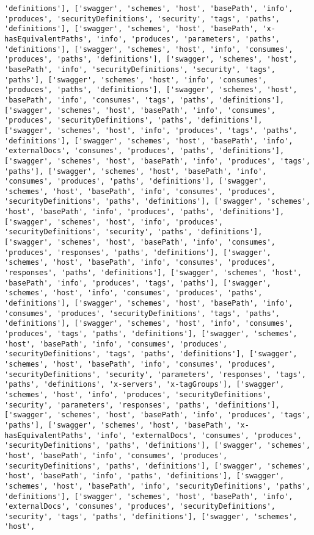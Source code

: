 \documentclass[11pt]{article}
\begin{document}
\begin{Verbatim}[commandchars=\\\{\}]
'definitions'], ['swagger', 'schemes', 'host', 'basePath', 'info', 'produces', 'securityDefinitions', 'security', 'tags', 'paths', 'definitions'], ['swagger', 'schemes', 'host', 'basePath', 'x-hasEquivalentPaths', 'info', 'produces', 'parameters', 'paths', 'definitions'], ['swagger', 'schemes', 'host', 'info', 'consumes', 'produces', 'paths', 'definitions'], ['swagger', 'schemes', 'host', 'basePath', 'info', 'securityDefinitions', 'security', 'tags', 'paths'], ['swagger', 'schemes', 'host', 'info', 'consumes', 'produces', 'paths', 'definitions'], ['swagger', 'schemes', 'host', 'basePath', 'info', 'consumes', 'tags', 'paths', 'definitions'], ['swagger', 'schemes', 'host', 'basePath', 'info', 'consumes', 'produces', 'securityDefinitions', 'paths', 'definitions'], ['swagger', 'schemes', 'host', 'info', 'produces', 'tags', 'paths', 'definitions'], ['swagger', 'schemes', 'host', 'basePath', 'info', 'externalDocs', 'consumes', 'produces', 'paths', 'definitions'], ['swagger', 'schemes', 'host', 'basePath', 'info', 'produces', 'tags', 'paths'], ['swagger', 'schemes', 'host', 'basePath', 'info', 'consumes', 'produces', 'paths', 'definitions'], ['swagger', 'schemes', 'host', 'basePath', 'info', 'consumes', 'produces', 'securityDefinitions', 'paths', 'definitions'], ['swagger', 'schemes', 'host', 'basePath', 'info', 'produces', 'paths', 'definitions'], ['swagger', 'schemes', 'host', 'info', 'produces', 'securityDefinitions', 'security', 'paths', 'definitions'], ['swagger', 'schemes', 'host', 'basePath', 'info', 'consumes', 'produces', 'responses', 'paths', 'definitions'], ['swagger', 'schemes', 'host', 'basePath', 'info', 'consumes', 'produces', 'responses', 'paths', 'definitions'], ['swagger', 'schemes', 'host', 'basePath', 'info', 'produces', 'tags', 'paths'], ['swagger', 'schemes', 'host', 'info', 'consumes', 'produces', 'paths', 'definitions'], ['swagger', 'schemes', 'host', 'basePath', 'info', 'consumes', 'produces', 'securityDefinitions', 'tags', 'paths', 'definitions'], ['swagger', 'schemes', 'host', 'info', 'consumes', 'produces', 'tags', 'paths', 'definitions'], ['swagger', 'schemes', 'host', 'basePath', 'info', 'consumes', 'produces', 'securityDefinitions', 'tags', 'paths', 'definitions'], ['swagger', 'schemes', 'host', 'basePath', 'info', 'consumes', 'produces', 'securityDefinitions', 'security', 'parameters', 'responses', 'tags', 'paths', 'definitions', 'x-servers', 'x-tagGroups'], ['swagger', 'schemes', 'host', 'info', 'produces', 'securityDefinitions', 'security', 'parameters', 'responses', 'paths', 'definitions'], ['swagger', 'schemes', 'host', 'basePath', 'info', 'produces', 'tags', 'paths'], ['swagger', 'schemes', 'host', 'basePath', 'x-hasEquivalentPaths', 'info', 'externalDocs', 'consumes', 'produces', 'securityDefinitions', 'paths', 'definitions'], ['swagger', 'schemes', 'host', 'basePath', 'info', 'consumes', 'produces', 'securityDefinitions', 'paths', 'definitions'], ['swagger', 'schemes', 'host', 'basePath', 'info', 'paths', 'definitions'], ['swagger', 'schemes', 'host', 'basePath', 'info', 'securityDefinitions', 'paths', 'definitions'], ['swagger', 'schemes', 'host', 'basePath', 'info', 'externalDocs', 'consumes', 'produces', 'securityDefinitions', 'security', 'tags', 'paths', 'definitions'], ['swagger', 'schemes', 'host', 
\end{Verbatim}
\end{document}
